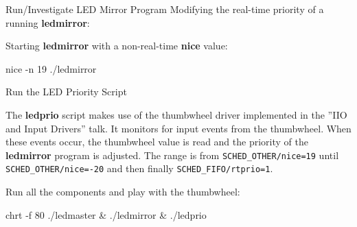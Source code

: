 \begin{Lab}
\begin{exe} {Run/Investigate LED Mirror Program}
   Modifying the real-time priority of a running \textbf{ledmirror}:

   Starting \textbf{ledmirror} with a non-real-time \textbf{nice} value:
   \begin{raw}
nice -n 19 ./ledmirror
   \end{raw}

\end{exe}

\clearpage

\begin{exe} {Run the LED Priority Script}

   The \textbf{ledprio} script makes use of the thumbwheel
   driver implemented in the ''IIO and Input Drivers'' talk.
   It monitors for input events from the thumbwheel. When
   these events occur, the thumbwheel value is read and the
   priority of the \textbf{ledmirror} program is adjusted.
   The range is from \texttt{SCHED\_OTHER/nice=19} until
   \texttt{SCHED\_OTHER/nice=-20} and then finally
   \texttt{SCHED\_FIFO/rtprio=1}.

   Run all the components and play with the thumbwheel:
   \begin{raw}
chrt -f 80 ./ledmaster &
./ledmirror &
./ledprio
   \end{raw}

\end{exe}

\end{Lab}
